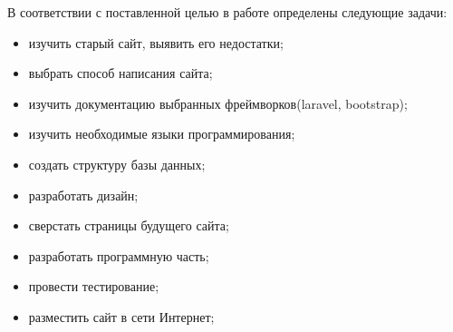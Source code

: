 \documentclass[14pt,Diplom]{diplomwork}
\begin{document}
В соответствии с поставленной целью в работе определены следующие задачи:
\begin{itemize}
\item изучить старый сайт, выявить его недостатки;
\item выбрать способ написания сайта;
\item изучить документацию выбранных фреймворков(laravel, bootstrap);
\item изучить необходимые языки программирования;
\item создать структуру базы данных;
\item разработать дизайн;
\item сверстать страницы будущего сайта;
\item разработать программную часть;
\item провести тестирование;
\item разместить сайт в сети Интернет;
\end{itemize}











		

\begin{thebibliography}{99}


\end{thebibliography}

\end{document}
